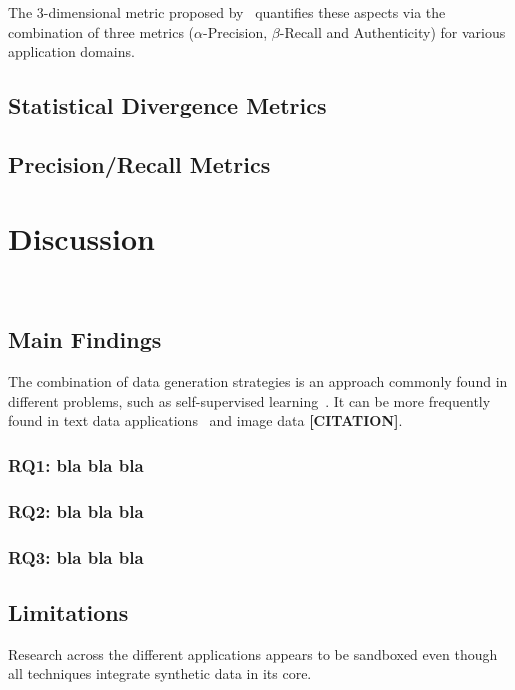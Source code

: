 \documentclass[parskip=full]{scrartcl}
\begin{document}
The 3-dimensional metric proposed by~\citet{alaa2022faithful} quantifies these
aspects via the combination of three metrics ($\alpha$-Precision,
$\beta$-Recall and Authenticity) for various application domains.

\subsection{Statistical Divergence Metrics} 

\subsection{Precision/Recall Metrics}

\section{Discussion}~\label{sec:discussion}

\subsection{Main Findings}

The combination of data generation strategies is an approach commonly found in
different problems, such as self-supervised
learning~\cite{grill2020bootstrap}. It can be more frequently found in text
data applications~\cite{bayer2021survey} and image data \textbf{[CITATION]}.

\subsubsection{RQ1: bla bla bla}

\subsubsection{RQ2: bla bla bla}

\subsubsection{RQ3: bla bla bla}

\subsection{Limitations}

Research across the different applications appears to be sandboxed even though
all techniques integrate synthetic data in its core.
\end{document}

